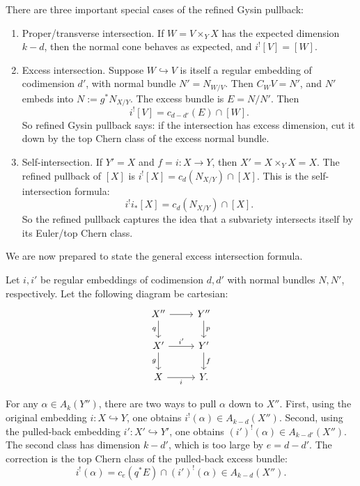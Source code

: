 \documentclass[12pt]{article}
\begin{document}
\begin{remark}
    There are three important special cases of the refined Gysin pullback: \begin{enumerate}
        \item Proper/transverse intersection. If $W=V\times_Y X$ has the expected dimension $k-d$, then the normal cone behaves as expected, and $i^![V]=[W]$. 

        \item Excess intersection. Suppose $W\hookrightarrow V$ is itself a regular embedding of codimension $d'$, with normal bundle $N'=N_{W/V}$. Then $C_WV=N'$, and $N'$ embeds into $N:=g^*N_{X/Y}$. The excess bundle is $E=N/N'$. Then
$$i^![V] = c_{d-d'}(E)\cap[W].$$
So refined Gysin pullback says: if the intersection has excess dimension, cut it down by the top Chern class of the excess normal bundle.

\item Self-intersection. If $Y'=X$ and $f=i:X\to Y$, then $X'=X\times_Y X=X$. The refined pullback of $[X]$ is $i^![X]=c_d(N_{X/Y})\cap[X]$. This is the self-intersection formula:
$$i^!i_*[X]=c_d(N_{X/Y})\cap[X].$$
So the refined pullback captures the idea that a subvariety intersects itself by its Euler/top Chern class.
\end{enumerate}
\end{remark}
We are now prepared to state the general excess intersection formula. 
\begin{theorem}
Let $i,i'$ be regular embeddings of codimension $d,d'$ with normal bundles $N,N'$, respectively. Let the following diagram be cartesian:
\[
\begin{tikzcd}
X'' \arrow[r] \arrow[d,"q"'] & Y'' \arrow[d,"p"] \\
X' \arrow[r,"i'"] \arrow[d,"g"'] & Y' \arrow[d,"f"] \\
X \arrow[r,"i"'] & Y .
\end{tikzcd}
\]


For any $\alpha\in A_k(Y'')$, there are two ways to pull $\alpha$ down to $X''$. First, using the original embedding $i:X\hookrightarrow Y$, one obtains $i^!(\alpha)\in A_{k-d}(X'')$. Second, using the pulled-back embedding $i':X'\hookrightarrow Y'$, one obtains $(i')^!(\alpha)\in A_{k-d'}(X'')$. The second class has dimension $k-d'$, which is too large by $e=d-d'$. The correction is the top Chern class of the pulled-back excess bundle:
$$i^!(\alpha) = c_e(q^*E)\cap (i')^!(\alpha) \in A_{k-d}(X'').$$
\end{theorem}
\end{document}
